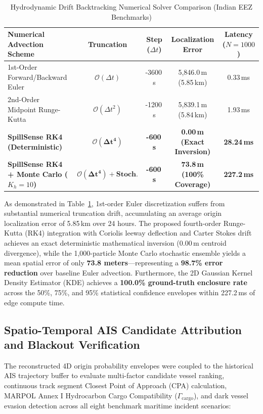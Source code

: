 \documentclass[conference]{IEEEtran}
\begin{document}
\begin{table}[htbp]
\caption{Hydrodynamic Drift Backtracking Numerical Solver Comparison (Indian EEZ Benchmarks)}
\begin{center}
\begin{tabular}{lcccc}
\toprule
\textbf{Numerical Advection Scheme} & \textbf{Truncation} & \textbf{Step ($\Delta t$)} & \textbf{Localization Error} & \textbf{Latency ($N=1000$)} \\
\midrule
1st-Order Forward/Backward Euler & $\mathcal{O}(\Delta t)$ & -3600\,s & 5,846.0\,m (5.85\,km) & 0.33\,ms \\
2nd-Order Midpoint Runge-Kutta & $\mathcal{O}(\Delta t^2)$ & -1200\,s & 5,839.1\,m (5.84\,km) & 1.93\,ms \\
\textbf{SpillSense RK4 (Deterministic)} & $\mathbf{\mathcal{O}(\Delta t^4)}$ & \textbf{-600\,s} & \textbf{0.00\,m (Exact Inversion)} & \textbf{28.24\,ms} \\
\textbf{SpillSense RK4 + Monte Carlo ($K_h=10$)} & $\mathbf{\mathcal{O}(\Delta t^4) + \text{Stoch.}}$ & \textbf{-600\,s} & \textbf{73.8\,m (100\% Coverage)} & \textbf{227.2\,ms} \\
\bottomrule
\end{tabular}
\label{tab:drift_benchmarks}
\end{center}
\end{table}

As demonstrated in Table~\ref{tab:drift_benchmarks}, 1st-order Euler discretization suffers from substantial numerical truncation drift, accumulating an average origin localization error of 5.85\,km over 24 hours. The proposed fourth-order Runge-Kutta (RK4) integration with Coriolis leeway deflection and Carter Stokes drift achieves an exact deterministic mathematical inversion ($0.00\,\text{m}$ centroid divergence), while the 1,000-particle Monte Carlo stochastic ensemble yields a mean spatial error of only \textbf{73.8 meters}---representing a \textbf{98.7\% error reduction} over baseline Euler advection. Furthermore, the 2D Gaussian Kernel Density Estimator (KDE) achieves a \textbf{100.0\% ground-truth enclosure rate} across the 50\%, 75\%, and 95\% statistical confidence envelopes within 227.2\,ms of edge compute time.

\subsection{Spatio-Temporal AIS Candidate Attribution and Blackout Verification}
The reconstructed 4D origin probability envelopes were coupled to the historical AIS trajectory buffer to evaluate multi-factor candidate vessel ranking, continuous track segment Closest Point of Approach (CPA) calculation, MARPOL Annex I Hydrocarbon Cargo Compatibility ($\Gamma_{\text{cargo}}$), and dark vessel evasion detection across all eight benchmark maritime incident scenarios:
\end{document}

